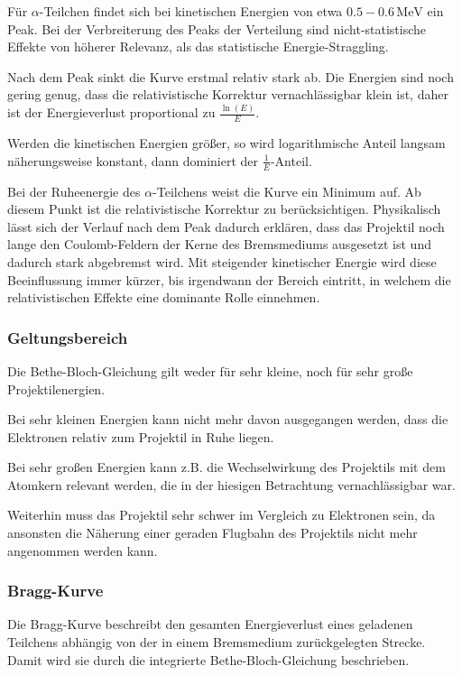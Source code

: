 \documentclass[12pt,a4paper]{scrartcl}
\numberwithin{equation}{section} %
\begin{document}
Für $\alpha$-Teilchen findet sich bei kinetischen Energien von etwa $0.5-0.6\mathrm{\,MeV}$ ein Peak. Bei der Verbreiterung des Peaks der Verteilung sind nicht-statistische Effekte von höherer Relevanz, als das statistische Energie-Straggling.

Nach dem Peak sinkt die Kurve erstmal relativ stark ab. Die Energien sind noch gering genug, dass die relativistische Korrektur vernachlässigbar klein ist, daher ist der Energieverlust proportional zu $\frac{\ln(E)}{E}$.

Werden die kinetischen Energien größer, so wird logarithmische Anteil langsam näherungsweise konstant, dann dominiert der $\frac{1}{E}$-Anteil.

Bei der Ruheenergie des $\alpha$-Teilchens weist die Kurve ein Minimum auf. Ab diesem Punkt ist die relativistische Korrektur zu berücksichtigen. Physikalisch lässt sich der Verlauf nach dem Peak dadurch erklären, dass das Projektil noch lange den Coulomb-Feldern der Kerne des Bremsmediums ausgesetzt ist und dadurch stark abgebremst wird. Mit steigender kinetischer Energie wird diese Beeinflussung immer kürzer, bis irgendwann der Bereich eintritt, in welchem die relativistischen Effekte eine dominante Rolle einnehmen.

\hypertarget{geltungsbereich}{%
\subsubsection{Geltungsbereich}\label{geltungsbereich}}

Die Bethe-Bloch-Gleichung gilt weder für sehr kleine, noch für sehr große Projektilenergien.

Bei sehr kleinen Energien kann nicht mehr davon ausgegangen werden, dass die Elektronen relativ zum Projektil in Ruhe liegen.

Bei sehr großen Energien kann z.B. die Wechselwirkung des Projektils mit dem Atomkern relevant werden, die in der hiesigen Betrachtung vernachlässigbar war.

Weiterhin muss das Projektil sehr schwer im Vergleich zu Elektronen sein, da ansonsten die Näherung einer geraden Flugbahn des Projektils nicht mehr angenommen werden kann.

\hypertarget{bragg-kurve}{%
\subsubsection{Bragg-Kurve}\label{bragg-kurve}}

Die Bragg-Kurve beschreibt den gesamten Energieverlust eines geladenen Teilchens abhängig von der in einem Bremsmedium zurückgelegten Strecke. Damit wird sie durch die integrierte Bethe-Bloch-Gleichung beschrieben.
\end{document}
